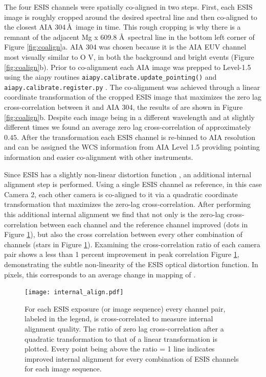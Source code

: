    		The four ESIS channels were spatially co-aligned in two steps.  
   		First, each ESIS image is roughly cropped around the desired spectral line and then co-aligned to the closest AIA 304\,\AA\ image in time.
   		This rough cropping is why there is a remnant of the adjacent Mg {\sc x} 609.8 \AA \ spectral line in the bottom left corner of Figure \ref{fig:coalign}a.
   		AIA 304 was chosen because it is the AIA EUV channel most visually similar to O V, in both the background and bright events (Figure \ref{fig:coalign}b).
   		Prior to co-alignment each AIA image was prepped to Level-1.5 using the aiapy routines \texttt{aiapy.calibrate.update\_pointing()} and \texttt{aiapy.calibrate.register.py}  \citep{aiapy}.
   		The co-alignment was achieved through a linear coordinate transformation of the cropped ESIS image that maximizes the zero lag cross-correlation between it and AIA 304, the results of are shown in Figure \ref{fig:coalign}b.
   		Despite each image being in a different wavelength and at slightly different times we found an average zero lag cross-correlation of approximately $0.45$.
   		After the transformation each ESIS channel is re-binned to AIA resolution and can be assigned the WCS  information from AIA Level 1.5 providing pointing information and easier co-alignment with other instruments.

    	Since ESIS has a slightly non-linear distortion function \citep{ESIS}, an additional internal alignment step is performed.
    	Using a single ESIS channel as reference, in this case Camera 2, each other camera is co-aligned to it via a quadratic coordinate transformation that maximizes the zero-lag cross-correlation. 
    	After performing this additional internal alignment we find that not only is the zero-lag cross-correlation between each channel and the reference channel improved (dots in Figure \ref{fig:cc}), but also the cross correlation between every other combination of channels (stars in Figure \ref{fig:cc}).
    	Examining the cross-correlation ratio of each camera pair shows a less than 1 percent improvement in peak correlation Figure \ref{fig:cc}, demonstrating the subtle non-linearity of the ESIS optical distortion function.
    	In pixels, this corresponds to an average change in mapping of .
    	
     	\begin{figure}[htb!]
    		\centering
    		\texttt{[image: internal\_align.pdf]}
    		\caption{For each ESIS exposure (or image sequence) every channel pair, labeled in the legend, is cross-correlated to measure internal alignment quality.  The ratio of zero lag cross-correlation after a quadratic transformation to that of a linear transformation is plotted.  Every point being above the ratio = 1 line indicates improved internal alignment for every combination of ESIS channels for each image sequence.}
    		\label{fig:cc}	
    	\end{figure}
    	
